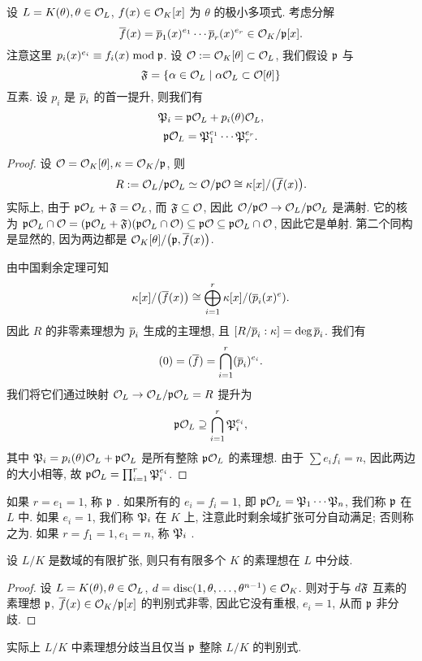 设 $L=K(\theta),\theta\in\CO_L$, $f(x)\in\CO_K[x]$ 为 $\theta$ 的极小多项式. 考虑分解
  \[\ov f(x)=\ov p_1(x)^{e_1}\cdots\ov p_r(x)^{e_r}\in \CO_K/\fp[x].\]
注意这里 $p_i(x)^{e_i}\equiv f_i(x)\mod \fp$. 
设 $\CO:=\CO_K[\theta]\subset\CO_L$, 我们假设 $\fp$ 与
  \[\fF=\set{\alpha\in\CO_L\mid \alpha\CO_L\subset \CO[\theta]}\] 
互素.
设 $p_i$ 是 $\ov p_i$ 的首一提升, 则我们有
  \[\fP_i=\fp\CO_L+p_i(\theta)\CO_L,\]
  \[\fp\CO_L=\fP_1^{e_1}\cdots\fP_r^{e_r}.\]
\begin{proof}
设 $\CO=\CO_K[\theta],\kappa=\CO_K/\fp$, 则
  \[R:=\CO_L/\fp\CO_L\simeq \CO/\fp\CO\cong \kappa[x]/\bigl(\ov f(x)\bigr).\]
实际上, 由于 $\fp\CO_L+\fF=\CO_L$, 而 $\fF\subseteq\CO$, 因此 $\CO/\fp\CO\to \CO_L/\fp\CO_L$ 是满射. 它的核为 $\fp\CO_L\cap \CO=(\fp\CO_L+\fF)(\fp\CO_L\cap \CO)\subseteq \fp\CO\subseteq \fp\CO_L\cap\CO$, 因此它是单射. 第二个同构是显然的, 因为两边都是 $\CO_K[\theta]/\bigl(\fp,\ov f(x)\bigr)$.

由中国剩余定理可知
  \[\kappa[x]/\bigl(\ov f(x)\bigr)\cong \bigoplus_{i=1}^r \kappa[x]/(\ov p_i(x)^e).\]
因此 $R$ 的非零素理想为 $\ov p_i$ 生成的主理想, 且 $[R/\ov p_i:\kappa]=\deg \ov p_i$. 我们有
  \[(0)=(\ov f)=\bigcap_{i=1}^r (\ov p_i)^{e_i}.\]
我们将它们通过映射 $\CO_L\to \CO_L/\fp\CO_L=R$ 提升为
  \[\fp\CO_L\supseteq \bigcap_{i=1}^r\fP_i^{e_i},\]
其中 $\fP_i=p_i(\theta)\CO_L+\fp\CO_L$ 是所有整除 $\fp\CO_L$ 的素理想. 由于 $\sum e_if_i=n$, 因此两边的大小相等, 故 $\fp\CO_L=\prod_{i=1}^r \fP_i^{e_i}$.
\end{proof}

如果 $r=e_1=1$, 称 $\fp$ .
如果所有的 $e_i=f_i=1$, 即 $\fp\CO_L=\fP_1\cdots\fP_n$, 我们称 $\fp$ 在 $L$ 中. 如果 $e_i=1$, 我们称 $\fP_i$ 在 $K$ 上, 注意此时剩余域扩张可分自动满足; 否则称之为. 如果 $r=f_1=1,e_1=n$, 称 $\fP_i$ .

\begin{proposition}{}{}
设 $L/K$ 是数域的有限扩张, 则只有有限多个 $K$ 的素理想在 $L$ 中分歧.
\end{proposition}
\begin{proof}
设 $L=K(\theta),\theta\in\CO_L$, $d=\disc(1,\theta,\dots,\theta^{n-1})\in\CO_K$. 则对于与 $d\fF$ 互素的素理想 $\fp$, $\ov f(x)\in\CO_K/\fp[x]$ 的判别式非零, 因此它没有重根, $e_i=1$, 从而 $\fp$ 非分歧.
\end{proof}

\begin{remark}
实际上 $L/K$ 中素理想分歧当且仅当 $\fp$ 整除 $L/K$ 的判别式.
\end{remark}

